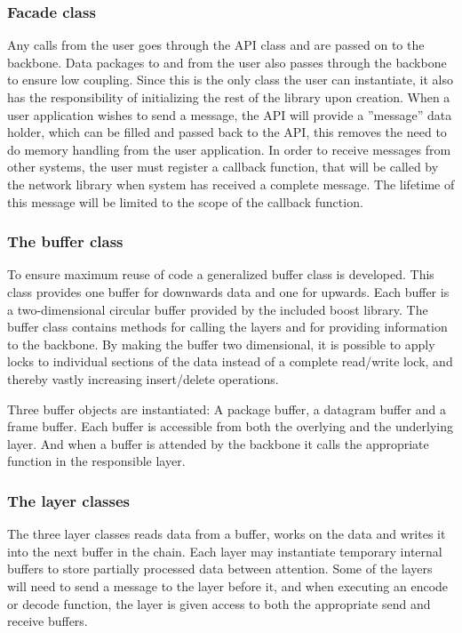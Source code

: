 \subsubsection{Facade class}
Any calls from the user goes through the API class and are passed on to the backbone. Data packages to and from the user also passes through the backbone to ensure low coupling. Since this is the only class the user can instantiate, it also has the responsibility of initializing the rest of the library upon creation.
When a user application wishes to send a message, the API will provide a ''message'' data holder, which can be filled and passed back to the API, this removes the need to do memory handling from the user application.
In order to receive messages from other systems, the user must register a callback function, that will be called by the network library when system has received a complete message. The lifetime of this message will be limited to the scope of the callback function.

\subsubsection{The buffer class}
To ensure maximum reuse of code a generalized buffer class is developed. This class provides one buffer for downwards data and one for upwards. Each buffer is a two-dimensional circular buffer provided by the included boost library. The buffer class contains methods for calling the layers and for providing information to the backbone.
By making the buffer two dimensional, it is possible to apply locks to individual sections of the data instead of a complete read/write lock, and thereby vastly increasing insert/delete operations.

Three  buffer objects are instantiated: A package buffer, a datagram buffer and a frame buffer. Each buffer is accessible from both the overlying and the underlying layer. And when a buffer is attended by the backbone it calls the appropriate function in the responsible layer.

\subsubsection{The layer classes}
The three layer classes reads data from a buffer, works on the data and writes it into the next buffer in the chain. Each layer may instantiate temporary internal buffers to store partially processed data between attention. Some of the layers will need to send a message to the layer before it, and when executing an encode or decode function, the layer is given access to both the appropriate send and receive buffers.

